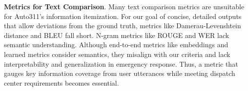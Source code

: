 



\noindent\textbf{Metrics for Text Comparison}. Many text comparison metrics are unsuitable for Auto311's information itemization. For our goal of concise, detailed outputs that allow deviations from the ground truth, metrics like Damerau-Levenshtein distance \cite{damerau1964technique} and BLEU \cite{papineni2002bleu} fall short. N-gram metrics like ROUGE \cite{lin-2004-rouge} and WER lack semantic understanding. Although end-to-end metrics like embeddings and learned metrics \cite{reimers-2019-sentence-bert, cer2018universal, artetxe-etal-2019-laser} consider semantics, they misalign with our criteria and lack interpretability and generalization in emergency response. Thus, a metric that gauges key information coverage from user utterances while meeting dispatch center requirements becomes essential.

